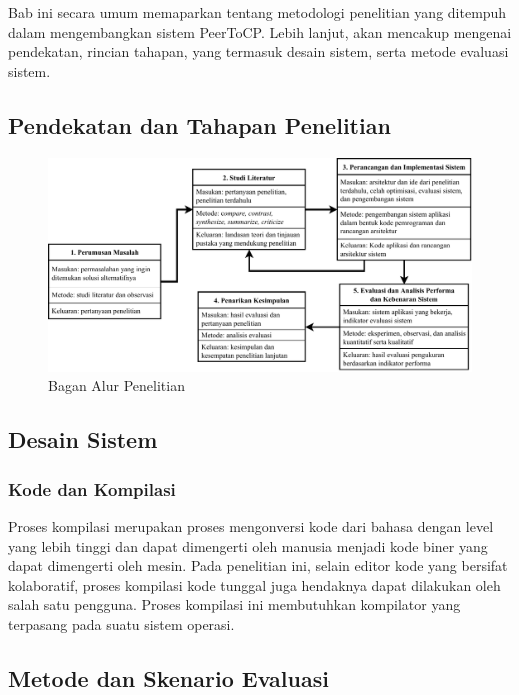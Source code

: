 \chapter{\babTiga}
\label{bab:3} 

Bab ini secara umum memaparkan tentang metodologi penelitian yang ditempuh dalam mengembangkan sistem PeerToCP. Lebih lanjut, akan mencakup mengenai pendekatan, rincian tahapan, yang termasuk desain sistem, serta metode evaluasi sistem.

\section{Pendekatan dan Tahapan Penelitian}

\begin{figure}
    \centering
    \includegraphics[scale=0.7]{assets/skripsi/MetodePenelitian.pdf}
    \caption{Bagan Alur Penelitian}
    \label{fig:my_label}
\end{figure}

\section{Desain Sistem}

\subsection{Kode dan Kompilasi}

Proses kompilasi merupakan proses mengonversi kode dari bahasa dengan level yang lebih tinggi dan dapat dimengerti oleh manusia menjadi kode biner yang dapat dimengerti oleh mesin. Pada penelitian ini, selain editor kode yang bersifat kolaboratif, proses kompilasi kode tunggal juga hendaknya dapat dilakukan oleh salah satu pengguna. Proses kompilasi ini membutuhkan kompilator yang terpasang pada suatu sistem operasi. 

\section{Metode dan Skenario Evaluasi}
